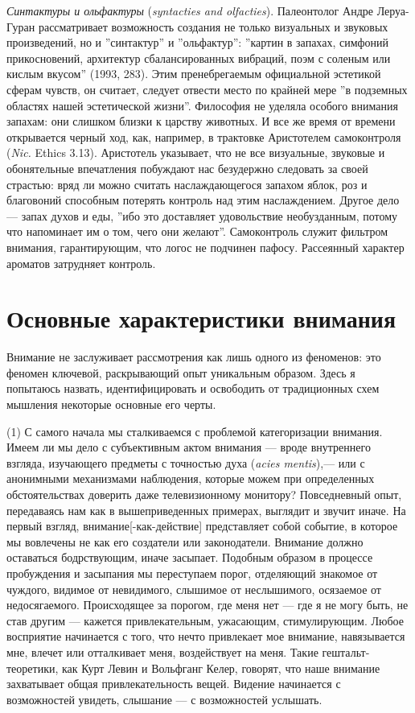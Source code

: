 \documentclass[12pt]{book}
\begin{document}
\textit{Синтактуры и ольфактуры} (\textit{syntacties and olfacties}). Палеонтолог Андре Леруа-Гуран рассматривает возможность создания не только визуальных и звуковых произведений, но и ''синтактур'' и ''ольфактур'': ''картин в запахах, симфоний прикосновений, архитектур сбалансированных вибраций, поэм с соленым или кислым вкусом'' (1993, 283). Этим пренебрегаемым официальной эстетикой сферам чувств, он считает, следует отвести место по крайней мере ''в подземных областях нашей эстетической жизни''. Философия не уделяла особого внимания запахам: они слишком близки к царству животных. И все же время от времени открывается черный ход, как, например, в трактовке Аристотелем самоконтроля (\textit{Nic.} Ethics 3.13). Аристотель указывает, что не все визуальные, звуковые и обонятельные впечатления побуждают нас безудержно следовать за своей страстью: вряд ли можно считать наслаждающегося запахом яблок, роз и благовоний способным потерять контроль над этим наслаждением. Другое дело --- запах духов и еды, ''ибо это доставляет удовольствие необузданным, потому что напоминает им о том, чего они желают''. Самоконтроль служит фильтром внимания, гарантирующим, что логос не подчинен пафосу. Рассеянный характер ароматов затрудняет контроль.

\section{Основные характеристики внимания}

Внимание не заслуживает рассмотрения как лишь одного из феноменов: это феномен ключевой, раскрывающий опыт уникальным образом. Здесь я попытаюсь назвать, идентифицировать и освободить от традиционных схем мышления некоторые основные его черты.

(1) С самого начала мы сталкиваемся с проблемой категоризации внимания. Имеем ли мы дело с субъективным актом внимания --- вроде внутреннего взгляда, изучающего предметы с точностью духа (\textit{acies mentis}),--- или с анонимными механизмами наблюдения, которые можем при определенных обстоятельствах доверить даже телевизионному монитору? Повседневный опыт, передаваясь нам как в вышеприведенных примерах, выглядит и звучит иначе. На первый взгляд, внимание[-как-действие] представляет собой событие, в которое мы вовлечены не как его создатели или законодатели. Внимание должно оставаться бодрствующим, иначе засыпает. Подобным образом в процессе пробуждения и засыпания мы переступаем порог, отделяющий знакомое от чуждого, видимое от невидимого, слышимое от неслышимого, осязаемое от недосягаемого. Происходящее за порогом, где меня нет --- где я не могу быть, не став другим --- кажется привлекательным, ужасающим, стимулирующим. Любое восприятие начинается с того, что нечто привлекает мое внимание, навязывается мне, влечет или отталкивает меня, воздействует на меня. Такие гештальт-теоретики, как Курт Левин и Вольфганг Келер, говорят, что наше внимание захватывает общая привлекательность вещей. Видение начинается с возможностей увидеть, слышание --- с возможностей услышать.
\end{document}
